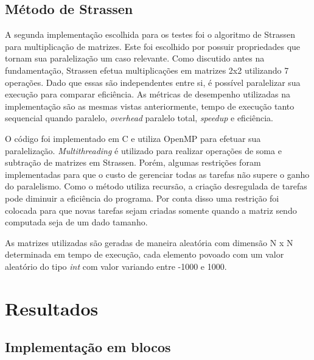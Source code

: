 \documentclass[12pt]{article}
\begin{document}
\subsection{Método de Strassen}
\par A segunda implementação escolhida para os testes foi o algoritmo de Strassen para multiplicação de matrizes. Este foi escolhido por possuir propriedades que tornam sua paralelização um caso relevante. Como discutido antes na fundamentação, Strassen efetua multiplicações em matrizes 2x2 utilizando 7 operações. Dado que essas são independentes entre si, é possível paralelizar sua execução para comparar eficiência.
As métricas de desempenho utilizadas na implementação são as mesmas vistas anteriormente, tempo de execução tanto sequencial quando paralelo, \textit{overhead} paralelo total, \textit{speedup} e eficiência.
\par O código foi implementado em C e utiliza OpenMP para efetuar sua paralelização. \textit{Multithreading} é utilizado para realizar operações de soma e subtração de matrizes em Strassen. Porém, algumas restrições foram implementadas para que o custo de gerenciar todas as tarefas não supere o ganho do paralelismo. Como o método utiliza recursão, a criação desregulada de tarefas pode diminuir a eficiência do programa. Por conta disso uma restrição foi colocada para que novas tarefas sejam criadas somente quando a matriz sendo computada seja de um dado tamanho.
\par As matrizes utilizadas são geradas de maneira aleatória com dimensão N x N determinada em tempo de execução, cada elemento povoado com um valor aleatório do tipo \textit{int} com valor variando entre -1000 e 1000.


\section{Resultados}

\subsection{Implementação em blocos}
\end{document}

